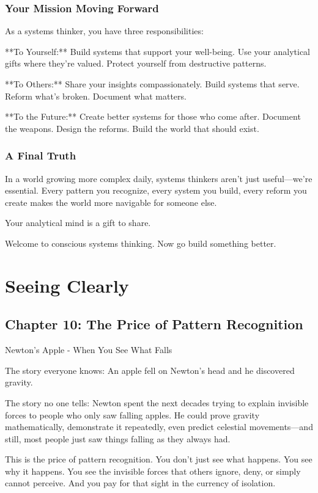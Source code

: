 \documentclass[12pt,oneside]{book}
\begin{document}
\section{Your Mission Moving Forward}

As a systems thinker, you have three responsibilities:

**To Yourself:** Build systems that support your well-being. Use your analytical gifts where they're valued. Protect yourself from destructive patterns.

**To Others:** Share your insights compassionately. Build systems that serve. Reform what's broken. Document what matters.

**To the Future:** Create better systems for those who come after. Document the weapons. Design the reforms. Build the world that should exist.

\section{A Final Truth}

In a world growing more complex daily, systems thinkers aren't just useful---we're essential. Every pattern you recognize, every system you build, every reform you create makes the world more navigable for someone else.

Your analytical mind is a gift to share.

Welcome to conscious systems thinking. Now go build something better.


\part{Seeing Clearly}

\chapter{Chapter 10: The Price of Pattern Recognition}

Newton's Apple - When You See What Falls

The story everyone knows: An apple fell on Newton's head and he discovered gravity.

The story no one tells: Newton spent the next decades trying to explain invisible forces to people who only saw falling apples. He could prove gravity mathematically, demonstrate it repeatedly, even predict celestial movements---and still, most people just saw things falling as they always had.

This is the price of pattern recognition. You don't just see what happens. You see why it happens. You see the invisible forces that others ignore, deny, or simply cannot perceive. And you pay for that sight in the currency of isolation.
\end{document}
